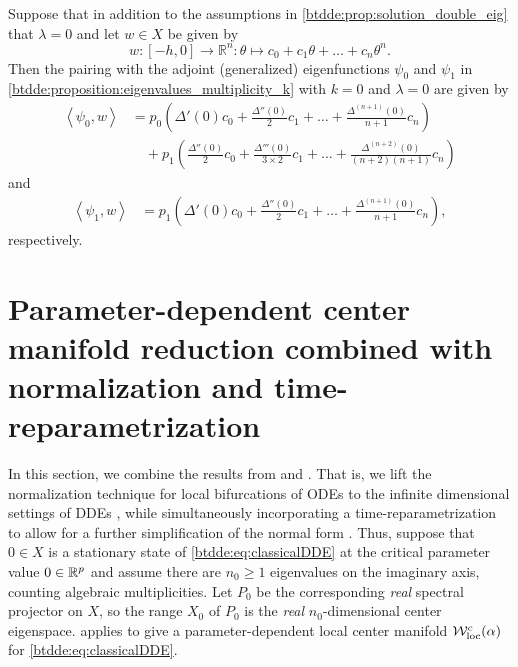 \begin{lemma}
\label{btdde:lemma:pairing_with_adjoint_eigenfunctions}
Suppose that in addition to the assumptions in \cref{btdde:prop:solution_double_eig} that $\lambda = 0$ and
let $w\in X$ be given by
\[
    w \colon [-h,0] \rightarrow \mathbb R^n 
      \colon \theta \mapsto c_0 + c_1 \theta + \dots + c_n \theta^n.
\]
Then the pairing with the adjoint (generalized) eigenfunctions $\psi_0$ and
$\psi_1$ in \cref{btdde:proposition:eigenvalues_multiplicity_k} with $k=0$ and
$\lambda=0$ are given by
\begin{align*}
    \left< \psi_0, w \right> &=
    p_0 \left( \Delta'(0) c_0 + \frac{\Delta''(0)}2 c_1 + \dots + \frac{\Delta^{(n + 1)}(0)}{n + 1} c_n \right) \\
    & \quad + p_1 \left( \frac{\Delta''(0)}{2} c_0 + 
        \frac{\Delta'''(0)}{3\times 2} c_1 + \dots + \frac{\Delta^{(n + 2)}(0)}{(n + 2)(n + 1)} c_n \right)
\end{align*}
and
\begin{align*}
    \left< \psi_1, w \right> &=
    p_1 \left( \Delta'(0) c_0 + \frac{\Delta''(0)}2 c_1 + \dots + \frac{\Delta^{(n + 1)}(0)}{n + 1} c_n \right),
\end{align*}
respectively.
\end{lemma}


\section{Parameter-dependent center manifold reduction combined with normalization and time-reparametrization}
\label{btdde:sec:Center_manifold_reduction}

In this section, we combine the results from
\cite{Bosschaert@Interplay} and \cite{Switching2019}. That is, we lift the normalization technique
for local bifurcations of ODEs to the infinite dimensional settings of DDEs
\cite{Switching2019}, while simultaneously incorporating a time-reparametrization 
to allow for a further simplification of the normal form \cite{Bosschaert@Interplay}.
Thus, suppose that $0 \in X$ is a stationary state of \cref{btdde:eq:classicalDDE} at the
critical parameter value $0 \in \mathbb{R}^p$ and assume there are $n_0 \ge 1$
eigenvalues on the imaginary axis, counting algebraic multiplicities. Let $P_0$
be the corresponding \emph{real} spectral projector on $X$, so the range $X_0$
of $P_0$ is the \emph{real} $n_0$-dimensional center eigenspace.
\cite[Corollary 20]{Switching2019}  applies to give a parameter-dependent local
center manifold $\mathcal{W}^c_{\text{loc}}(\alpha)$ for \cref{btdde:eq:classicalDDE}.

